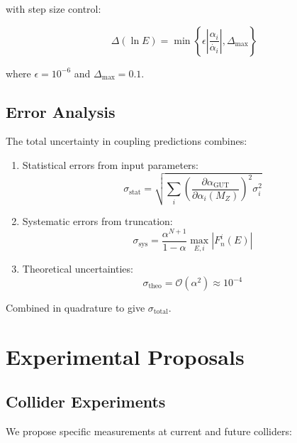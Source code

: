 \documentclass{article}
\begin{document}
with step size control:

\begin{equation}
\Delta(\ln E) = \min\left\{\epsilon\left|\frac{\alpha_i}{\dot{\alpha_i}}\right|, \Delta_{\text{max}}\right\}
\end{equation}

where $\epsilon = 10^{-6}$ and $\Delta_{\text{max}} = 0.1$.

\subsection{Error Analysis}

The total uncertainty in coupling predictions combines:

\begin{enumerate}
\item Statistical errors from input parameters:
   \begin{equation}
   \sigma_{\text{stat}} = \sqrt{\sum_i \left(\frac{\partial\alpha_{\text{GUT}}}{\partial\alpha_i(M_Z)}\right)^2 \sigma_i^2}
   \end{equation}

\item Systematic errors from truncation:
   \begin{equation}
   \sigma_{\text{sys}} = \frac{\alpha^{N+1}}{1-\alpha} \max_{E,i} |F_n^i(E)|
   \end{equation}

\item Theoretical uncertainties:
   \begin{equation}
   \sigma_{\text{theo}} = \mathcal{O}(\alpha^2) \approx 10^{-4}
   \end{equation}
\end{enumerate}

Combined in quadrature to give $\sigma_{\text{total}}$.

\section{Experimental Proposals}
\label{app:experiments}

\subsection{Collider Experiments}

We propose specific measurements at current and future colliders:
\end{document}
